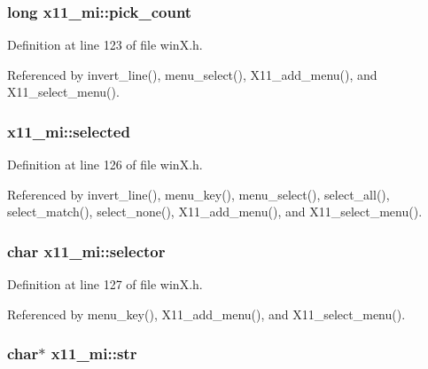 \hypertarget{structx11__mi_a8ac48ec61fd5a7ff698e446261aef123}{
\subsubsection[{pick\+\_\+count}]{\setlength{\rightskip}{0pt plus 5cm}long x11\+\_\+mi\+::pick\+\_\+count}}\label{structx11__mi_a8ac48ec61fd5a7ff698e446261aef123}


Definition at line 123 of file win\+X.\+h.



Referenced by invert\+\_\+line(), menu\+\_\+select(), X11\+\_\+add\+\_\+menu(), and X11\+\_\+select\+\_\+menu().

\hypertarget{structx11__mi_a902f7ae6edb62076a998bcb9fb848fb1}{
\subsubsection[{selected}]{ x11\+\_\+mi\+::selected}}\label{structx11__mi_a902f7ae6edb62076a998bcb9fb848fb1}


Definition at line 126 of file win\+X.\+h.



Referenced by invert\+\_\+line(), menu\+\_\+key(), menu\+\_\+select(), select\+\_\+all(), select\+\_\+match(), select\+\_\+none(), X11\+\_\+add\+\_\+menu(), and X11\+\_\+select\+\_\+menu().

\hypertarget{structx11__mi_aebb497676a238d95ae96abc951958c48}{
\subsubsection[{selector}]{\setlength{\rightskip}{0pt plus 5cm}char x11\+\_\+mi\+::selector}}\label{structx11__mi_aebb497676a238d95ae96abc951958c48}


Definition at line 127 of file win\+X.\+h.



Referenced by menu\+\_\+key(), X11\+\_\+add\+\_\+menu(), and X11\+\_\+select\+\_\+menu().

\hypertarget{structx11__mi_a9a83733faede9dce800417224d72b8cc}{
\subsubsection[{str}]{\setlength{\rightskip}{0pt plus 5cm}char$\ast$ x11\+\_\+mi\+::str}}\label{structx11__mi_a9a83733faede9dce800417224d72b8cc}


